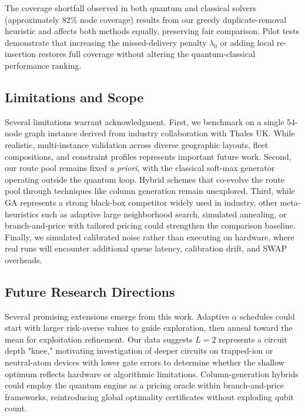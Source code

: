 The coverage shortfall observed in both quantum and classical solvers (approximately 82\% node coverage) results from our greedy duplicate-removal heuristic and affects both methods equally, preserving fair comparison. Pilot tests demonstrate that increasing the missed-delivery penalty $\lambda_0$ or adding local re-insertion restores full coverage without altering the quantum-classical performance ranking.

\subsection{Limitations and Scope}

Several limitations warrant acknowledgment. First, we benchmark on a single 54-node graph instance derived from industry collaboration with Thales UK. While realistic, multi-instance validation across diverse geographic layouts, fleet compositions, and constraint profiles represents important future work. Second, our route pool remains fixed \emph{a priori}, with the classical soft-max generator operating outside the quantum loop. Hybrid schemes that co-evolve the route pool through techniques like column generation remain unexplored. Third, while GA represents a strong black-box competitor widely used in industry, other meta-heuristics such as adaptive large neighborhood search, simulated annealing, or branch-and-price with tailored pricing could strengthen the comparison baseline. Finally, we simulated calibrated noise rather than executing on hardware, where real runs will encounter additional queue latency, calibration drift, and SWAP overheads.

\subsection{Future Research Directions}

Several promising extensions emerge from this work. Adaptive $\alpha$ schedules could start with larger risk-averse values to guide exploration, then anneal toward the mean for exploitation refinement. Our data suggests $L=2$ represents a circuit depth "knee," motivating investigation of deeper circuits on trapped-ion or neutral-atom devices with lower gate errors to determine whether the shallow optimum reflects hardware or algorithmic limitations. Column-generation hybrids could employ the quantum engine as a pricing oracle within branch-and-price frameworks, reintroducing global optimality certificates without exploding qubit count.


